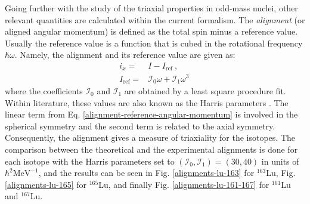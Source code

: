 Going further with the study of the triaxial properties in odd-mass nuclei, other relevant quantities are calculated within the current formalism. The \emph{alignment} (or aligned angular momentum) is defined as the total spin minus a reference value. Usually the reference value is a function that is cubed in the rotational frequency $\hbar\omega$. Namely, the alignment and its reference value are given as:
\begin{align}
    i_x=&I-I_\text{ref}\ ,\nonumber\\
    I_\text{ref}=&\mathcal{I}_0\omega+\mathcal{I}_1\omega^3 \,
    \label{alignment-reference-angular-momentum}
\end{align}
where the coefficients $\mathcal{I}_0$ and $\mathcal{I}_1$ are obtained by a least square procedure fit. Within literature, these values are also known as the Harris parameters \cite{harris1965higher}. The linear term from Eq. \ref{alignment-reference-angular-momentum} is involved in the spherical symmetry and the second term is related to the axial symmetry. Consequently, the alignment gives a measure of triaxiality for the isotopes. The comparison between the theoretical and the experimental alignments is done for each isotope with the Harris parameters set to $\left(\mathcal{I}_0,\mathcal{I}_1\right)=\left(30,40\right)$ in units of $\hbar^2\text{MeV}^{-1}$, and the results can be seen in Fig. \ref{alignments-lu-163} for $^{163}$Lu, Fig. \ref{alignments-lu-165} for $^{165}$Lu, and finally Fig. \ref{alignments-lu-161-167} for $^{161}$Lu and $^{167}$Lu.
